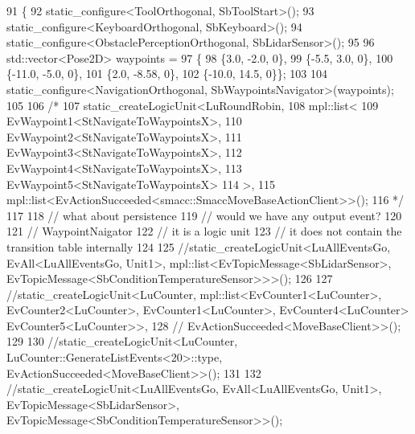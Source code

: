 \begin{DoxyCode}
91   \{
92     static\_configure<ToolOrthogonal, SbToolStart>();
93     static\_configure<KeyboardOrthogonal, SbKeyboard>();
94     static\_configure<ObstaclePerceptionOrthogonal, SbLidarSensor>();
95 
96     std::vector<Pose2D> waypoints =
97         \{
98             \{3.0, -2.0, 0\},
99             \{-5.5, 3.0, 0\},
100             \{-11.0, -5.0, 0\},
101             \{2.0, -8.58, 0\},
102             \{-10.0, 14.5, 0\}\};
103 
104     static\_configure<NavigationOrthogonal, SbWaypointsNavigator>(waypoints);
105 
106     \textcolor{comment}{/*}
107 \textcolor{comment}{    static\_createLogicUnit<LuRoundRobin, }
108 \textcolor{comment}{                              mpl::list<}
109 \textcolor{comment}{                                   EvWaypoint1<StNavigateToWaypointsX>,}
110 \textcolor{comment}{                                   EvWaypoint2<StNavigateToWaypointsX>,}
111 \textcolor{comment}{                                   EvWaypoint3<StNavigateToWaypointsX>, }
112 \textcolor{comment}{                                   EvWaypoint4<StNavigateToWaypointsX>,}
113 \textcolor{comment}{                                   EvWaypoint5<StNavigateToWaypointsX>}
114 \textcolor{comment}{                                  >, }
115 \textcolor{comment}{                         mpl::list<EvActionSucceeded<smacc::SmaccMoveBaseActionClient>>();}
116 \textcolor{comment}{                         */}
117 
118     \textcolor{comment}{// what about persistence}
119     \textcolor{comment}{// would we have any output event?}
120 
121     \textcolor{comment}{// WaypointNaigator}
122     \textcolor{comment}{// it is a logic unit}
123     \textcolor{comment}{// it does not contain the transition table internally}
124 
125     \textcolor{comment}{//static\_createLogicUnit<LuAllEventsGo, EvAll<LuAllEventsGo, Unit1>,
       mpl::list<EvTopicMessage<SbLidarSensor>, EvTopicMessage<SbConditionTemperatureSensor>>>();}
126 
127     \textcolor{comment}{//static\_createLogicUnit<LuCounter, mpl::list<EvCounter1<LuCounter>, EvCounter2<LuCounter>,
       EvCounter1<LuCounter>, EvCounter4<LuCounter> EvCounter5<LuCounter>>,}
128     \textcolor{comment}{//                       EvActionSucceeded<MoveBaseClient>>();}
129 
130     \textcolor{comment}{//static\_createLogicUnit<LuCounter, LuCounter::GenerateListEvents<20>::type,
       EvActionSucceeded<MoveBaseClient>>();}
131 
132     \textcolor{comment}{//static\_createLogicUnit<LuAllEventsGo, EvAll<LuAllEventsGo, Unit1>,          
       EvTopicMessage<SbLidarSensor>, EvTopicMessage<SbConditionTemperatureSensor>>();}

\end{DoxyCode}
